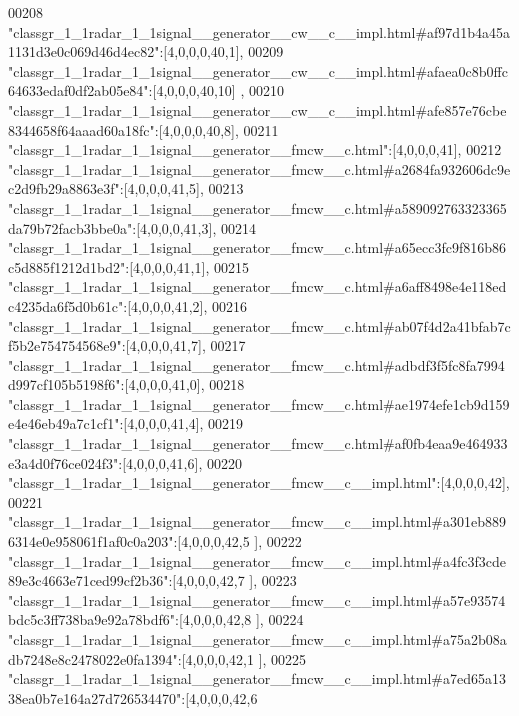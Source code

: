 \begin{DoxyCode}
00208 \textcolor{stringliteral}{"classgr\_1\_1radar\_1\_1signal\_\_generator\_\_cw\_\_c\_\_impl.html#af97d1b4a45a1131d3e0c069d46d4ec82"}:[4,0,0,0,40,1],
00209 \textcolor{stringliteral}{"classgr\_1\_1radar\_1\_1signal\_\_generator\_\_cw\_\_c\_\_impl.html#afaea0c8b0ffc64633edaf0df2ab05e84"}:[4,0,0,0,40,10]
      ,
00210 \textcolor{stringliteral}{"classgr\_1\_1radar\_1\_1signal\_\_generator\_\_cw\_\_c\_\_impl.html#afe857e76cbe8344658f64aaad60a18fc"}:[4,0,0,0,40,8],
00211 \textcolor{stringliteral}{"classgr\_1\_1radar\_1\_1signal\_\_generator\_\_fmcw\_\_c.html"}:[4,0,0,0,41],
00212 \textcolor{stringliteral}{"classgr\_1\_1radar\_1\_1signal\_\_generator\_\_fmcw\_\_c.html#a2684fa932606dc9ec2d9fb29a8863e3f"}:[4,0,0,0,41,5],
00213 \textcolor{stringliteral}{"classgr\_1\_1radar\_1\_1signal\_\_generator\_\_fmcw\_\_c.html#a589092763323365da79b72facb3bbe0a"}:[4,0,0,0,41,3],
00214 \textcolor{stringliteral}{"classgr\_1\_1radar\_1\_1signal\_\_generator\_\_fmcw\_\_c.html#a65ecc3fc9f816b86c5d885f1212d1bd2"}:[4,0,0,0,41,1],
00215 \textcolor{stringliteral}{"classgr\_1\_1radar\_1\_1signal\_\_generator\_\_fmcw\_\_c.html#a6aff8498e4e118edc4235da6f5d0b61c"}:[4,0,0,0,41,2],
00216 \textcolor{stringliteral}{"classgr\_1\_1radar\_1\_1signal\_\_generator\_\_fmcw\_\_c.html#ab07f4d2a41bfab7cf5b2e754754568e9"}:[4,0,0,0,41,7],
00217 \textcolor{stringliteral}{"classgr\_1\_1radar\_1\_1signal\_\_generator\_\_fmcw\_\_c.html#adbdf3f5fc8fa7994d997cf105b5198f6"}:[4,0,0,0,41,0],
00218 \textcolor{stringliteral}{"classgr\_1\_1radar\_1\_1signal\_\_generator\_\_fmcw\_\_c.html#ae1974efe1cb9d159e4e46eb49a7c1cf1"}:[4,0,0,0,41,4],
00219 \textcolor{stringliteral}{"classgr\_1\_1radar\_1\_1signal\_\_generator\_\_fmcw\_\_c.html#af0fb4eaa9e464933e3a4d0f76ce024f3"}:[4,0,0,0,41,6],
00220 \textcolor{stringliteral}{"classgr\_1\_1radar\_1\_1signal\_\_generator\_\_fmcw\_\_c\_\_impl.html"}:[4,0,0,0,42],
00221 \textcolor{stringliteral}{"classgr\_1\_1radar\_1\_1signal\_\_generator\_\_fmcw\_\_c\_\_impl.html#a301eb8896314e0e958061f1af0c0a203"}:[4,0,0,0,42,5
      ],
00222 \textcolor{stringliteral}{"classgr\_1\_1radar\_1\_1signal\_\_generator\_\_fmcw\_\_c\_\_impl.html#a4fc3f3cde89e3c4663e71ced99cf2b36"}:[4,0,0,0,42,7
      ],
00223 \textcolor{stringliteral}{"classgr\_1\_1radar\_1\_1signal\_\_generator\_\_fmcw\_\_c\_\_impl.html#a57e93574bdc5c3ff738ba9e92a78bdf6"}:[4,0,0,0,42,8
      ],
00224 \textcolor{stringliteral}{"classgr\_1\_1radar\_1\_1signal\_\_generator\_\_fmcw\_\_c\_\_impl.html#a75a2b08adb7248e8c2478022e0fa1394"}:[4,0,0,0,42,1
      ],
00225 \textcolor{stringliteral}{"classgr\_1\_1radar\_1\_1signal\_\_generator\_\_fmcw\_\_c\_\_impl.html#a7ed65a1338ea0b7e164a27d726534470"}:[4,0,0,0,42,6

\end{DoxyCode}
